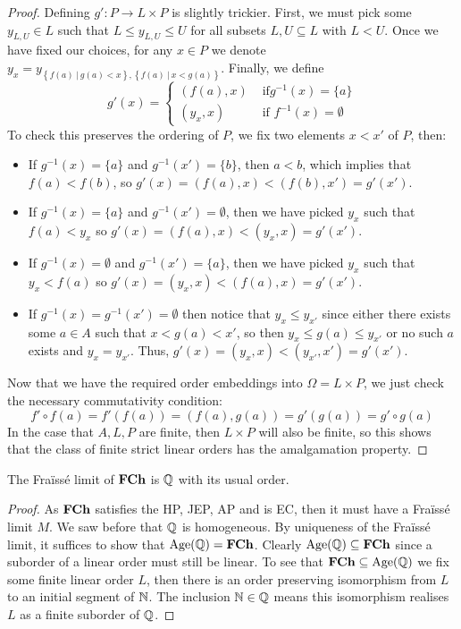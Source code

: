 \begin{proof}
  Defining $g' : P \to L \times P$ is slightly trickier. First, we must pick some $y_{L,U} \in L$
  such that $L \leq y_{L,U} \leq U$ for all subsets $L,U \subseteq L$ with $L < U$. Once
  we have fixed our choices, for any $x \in P$ we denote
  $y_x =  y_{\left\{f(a)\ |\ g(a) < x\right\}, \left\{f(a)\ |\ x < g(a)\right\}}$.
  Finally, we define
  \begin{equation*}
    g'(x) = \begin{cases}
      (f(a), x) & \text{ if} g^{-1}(x) = \{a\} \\
      (y_x, x)  & \text{ if } f^{-1}(x) = \emptyset
    \end{cases}
  \end{equation*}
  To check this preserves the ordering of $P$, we fix two elements $x < x'$ of $P$, then:
  \begin{itemize}
    \item If $g^{-1}(x) = \{a\}$ and $g^{-1}(x') = \{b\}$, then $a < b$, which implies that
      $f(a) < f(b)$, so $g'(x) = (f(a),x) < (f(b),x') = g'(x')$.
    \item If $g^{-1}(x) = \{a\}$ and $g^{-1}(x') = \emptyset$, then we have picked $y_x$ such that
      $f(a) < y_x$ so $g'(x) = (f(a),x) < (y_x, x) = g'(x')$.
    \item If $g^{-1}(x) = \emptyset$ and $g^{-1}(x') = \{a\}$, then we have picked $y_x$ such that
      $y_x < f(a)$ so $g'(x) = (y_x, x) < (f(a),x) = g'(x')$.
    \item If $g^{-1}(x) = g^{-1}(x') = \emptyset$ then notice that $y_x \leq y_{x'}$ since
      either there exists some $a \in A$ such that $x < g(a) < x'$, so then
      $y_x \leq g(a) \leq y_{x'}$ or no such $a$ exists and $y_x = y_{x'}$. Thus,
      $g'(x) = (y_x,x) < (y_{x'}, x') = g'(x')$.
  \end{itemize}
  Now that we have the required order embeddings into $\Omega = L \times P$, we just check the
  necessary commutativity condition:
  \begin{equation*}
    f' \circ f(a) = f'(f(a)) = (f(a),g(a)) = g'(g(a)) = g' \circ g(a)
  \end{equation*}
  In the case that $A,L,P$ are finite, then $L \times P$ will also be finite, so this
  shows that the class of finite strict linear orders has the amalgamation property.
\end{proof}

\begin{thm}
  The Fraïssé limit of $\textbf{FCh}$ is $\mathbb{Q}$ with its usual order.
\end{thm}
\begin{proof}
  As $\textbf{FCh}$ satisfies the HP, JEP, AP and is EC, then it must have a Fraïssé limit $M$. We saw
  before that $\mathbb{Q}$ is homogeneous. By uniqueness of the Fraïssé limit, it suffices to show that
  $\operatorname{Age}(\mathbb{Q}) = \textbf{FCh}$. Clearly $\operatorname{Age}(\mathbb{Q}) \subseteq \textbf{FCh}$ since
  a suborder of a linear order must still be linear. To see that $\textbf{FCh} \subseteq \operatorname{Age}(\mathbb{Q})$ we fix
  some finite linear order $L$, then there is an order preserving isomorphism from $L$ to an initial
  segment of $\mathbb{N}$. The inclusion $\mathbb{N} \in \mathbb{Q}$ means this isomorphism realises $L$ as a finite
  suborder of $\mathbb{Q}$.
\end{proof}

